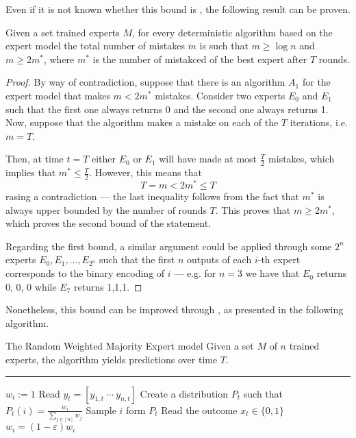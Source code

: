 \documentclass[a4paper, 12pt]{report}
\begin{document}
    Even if it is not known whether this bound is , the following result can be proven.

    \begin{framedthm}{}
        Given a set trained experts $M$, for every deterministic algorithm based on the expert model the total number of mistakes $m$ is such that $m \ge \log n$ and $m \ge 2{m^*}$, where $m^*$ is the number of mistakced of the best expert after $T$ rounds.
    \end{framedthm}

    \begin{proof}
        By way of contradiction, suppose that there is an algorithm $A_1$ for the expert model that makes $m < 2{m^*}$ mistakes. Consider two experts $E_0$ and $E_1$ such that the first one always returns 0 and the second one always returns 1. Now, suppose that the algorithm makes a mistake on each of the $T$ iterations, i.e. $m = T$.

        Then, at time $t = T$ either $E_0$ or $E_1$ will have made at most $\tfrac{T}{2}$ mistakes, which implies that $m^* \le \tfrac{T}{2}$. However, this means that $$T = m < 2{m^*} \le T$$ rasing a contradiction --- the last inequality follows from the fact that $m^*$ is always upper bounded by the number of rounds $T$. This proves that $m \ge 2{m^*}$, which proves the second bound of the statement.

        Regarding the first bound, a similar argument could be applied through some $2^n$ experts $E_0, E_1, \ldots, E_{2^n}$ such that the first $n$ outputs of each $i$-th expert corresponds to the binary encoding of $i$ --- e.g. for $n = 3$ we have that $E_0$ returns 0, 0, 0 while $E_7$ returns 1,1,1.
    \end{proof}

    Nonetheless, this bound can be improved through , as presented in the following algorithm.

    \begin{framedalgo}{The Random Weighted Majority Expert model}
        Given a set $M$ of $n$ trained experts, the algorithm yields predictions over time $T$. \\
        \hrule

        \quad
        \begin{algorithmic}[1]
                    \State $w_i := 1$
                \EndFor
                    \State Read $y_t = [y_{1, t} \ \cdots \ y_{n, t}]$
                    \State Create a distribution $P_t$ such that $P_t(i) = \tfrac{w_i}{\sum_{j \in [n]}{w_j}}$
                    \State Sample $i$ form $P_t$
                    \State Read the outcome $x_t \in \{0, 1\}$
                                \State $w_i = (1 - \varepsilon) w_i$
                            \EndIf
                        \EndFor
                    \EndIf
                \EndFor
            \EndFunction
        \end{algorithmic}
    \end{framedalgo}
\end{document}
